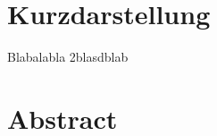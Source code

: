\thispagestyle{empty}
\section*{Kurzdarstellung}
\label{sec:kurzdarstellung}

Blabalabla \cite{Kuhnapfel.2019}
2blasdblab \cite{Rogers.2011}


\section*{Abstract}
\label{sec:abstract}

\blindtext
